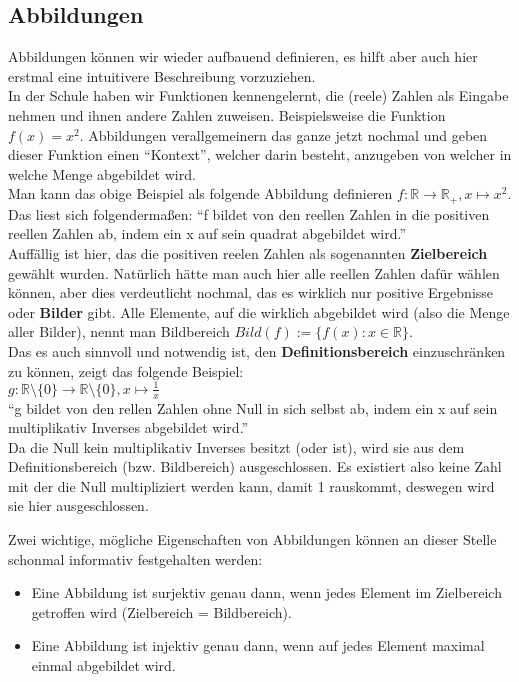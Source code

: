 \documentclass[parskip=full]{scrartcl}
\begin{document}
    \subsection{Abbildungen}
        Abbildungen können wir wieder aufbauend definieren, es hilft aber auch hier erstmal eine intuitivere Beschreibung vorzuziehen.
        \\In der Schule haben wir Funktionen kennengelernt, die (reele) Zahlen als Eingabe nehmen und ihnen andere Zahlen zuweisen.
        Beispielsweise die Funktion \(f(x) = x^2\). Abbildungen verallgemeinern das ganze jetzt nochmal und geben dieser Funktion einen \enquote{Kontext},
        welcher darin besteht, anzugeben von welcher in welche Menge abgebildet wird.
        \\Man kann das obige Beispiel als folgende Abbildung definieren \(f: \mathbb{R} \to \mathbb{R}_+, x \mapsto x^2\). 
        \\Das liest sich folgendermaßen: \enquote{f bildet von den reellen Zahlen in die positiven reellen Zahlen ab, 
        indem ein x auf sein quadrat abgebildet wird.}
        \\Auffällig ist hier, das die positiven reelen Zahlen als sogenannten \textbf{Zielbereich} gewählt wurden.
        Natürlich hätte man auch hier alle reellen Zahlen dafür wählen können, aber dies verdeutlicht nochmal, das es wirklich nur positive Ergebnisse oder \textbf{Bilder} gibt.
        Alle Elemente, auf die wirklich abgebildet wird (also die Menge aller Bilder), nennt man Bildbereich \(Bild(f) := \{f(x) : x \in \mathbb{R}\}\).
        \\Das es auch sinnvoll und notwendig ist, den \textbf{Definitionsbereich} einzuschränken zu können, zeigt das folgende Beispiel: 
        \\\(g: \mathbb{R} \setminus \{0\} \to \mathbb{R} \setminus \{0\}, x \mapsto \frac{1}{x}\)
        \\\enquote{g bildet von den rellen Zahlen ohne Null in sich selbst ab, indem ein x auf sein multiplikativ Inverses abgebildet wird.}
        \\Da die Null kein multiplikativ Inverses besitzt (oder ist), wird sie aus dem Definitionsbereich (bzw. Bildbereich) ausgeschlossen.
        Es existiert also keine Zahl mit der die Null multipliziert werden kann, damit 1 rauskommt, deswegen wird sie hier ausgeschlossen. 
        
        Zwei wichtige, mögliche Eigenschaften von Abbildungen können an dieser Stelle schonmal informativ festgehalten werden:
        \begin{itemize}
            \item Eine Abbildung ist surjektiv genau dann, wenn jedes Element im Zielbereich getroffen wird (Zielbereich = Bildbereich).
            \item Eine Abbildung ist injektiv genau dann, wenn auf jedes Element maximal einmal abgebildet wird. 
        \end{itemize}
\end{document}
